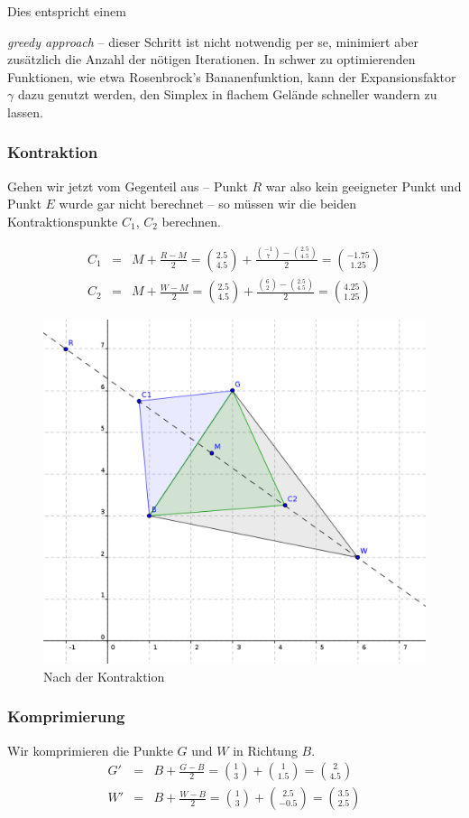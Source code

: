 \documentclass[naustrian]{article}
\begin{document}
Dies entspricht einem {\emph{greedy approach} -- dieser
Schritt ist nicht notwendig per se, minimiert aber zusätzlich die Anzahl
der nötigen Iterationen. In schwer zu optimierenden Funktionen, wie etwa
Rosenbrock's Bananenfunktion, kann der Expansionsfaktor $\gamma$ dazu genutzt werden,
den Simplex in flachem Gelände schneller wandern zu lassen.

\subsubsection{Kontraktion}

Gehen wir jetzt vom Gegenteil aus -- Punkt $R$ war also
kein geeigneter Punkt und Punkt $E$ wurde gar nicht berechnet --
so müssen wir die beiden Kontraktionspunkte $C_{1}$, $C_{2}$ berechnen.

\begin{eqnarray*}
    C_{1} & = & M+\frac{R-M}{2}=\binom{2.5}{4.5}+\frac{\binom{-1}{7}-\binom{2.5}{4.5}}{2}=\binom{-1.75}{1.25}\\
    C_{2} & = & M+\frac{W-M}{2}=\binom{2.5}{4.5}+\frac{\binom{6}{2}-\binom{2.5}{4.5}}{2}=\binom{4.25}{1.25}
\end{eqnarray*}

\begin{figure}[h]
    \centering
    \includegraphics[width=.5\textwidth]{nelder_mead/triangle_contract}
    \caption{Nach der Kontraktion}
\end{figure}

\subsubsection{Komprimierung}

Wir komprimieren die Punkte $G$ und $W$ in Richtung $B$.
\begin{eqnarray*}
    G' & = & B+\frac{G-B}{2}=\binom{1}{3}+\binom{1}{1.5}=\binom{2}{4.5}\\
    W' & = & B+\frac{W-B}{2}=\binom{1}{3}+\binom{2.5}{-0.5}=\binom{3.5}{2.5}
\end{eqnarray*}

}
\end{document}
